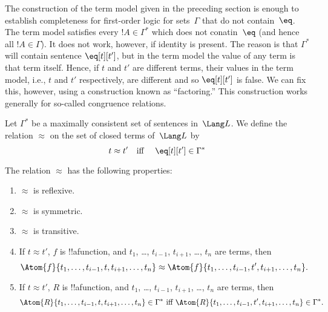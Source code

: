 \documentclass[../../include/open-logic-section]{subfiles}
\begin{document}

\begin{explain}
The construction of the term model given in the preceding section is
enough to establish completeness for first-order logic for
sets~$\Gamma$ that do not contain~$\eq$.  The term model satisfies
every $!A \in \Gamma^*$ which does not conatin~$\eq$ (and hence all
$!A \in \Gamma$).  It does not work, however, if identity is present.
The reason is that $\Gamma^*$ will contain sentence $\eq[t][t']$, but
in the term model the value of any term is that term itself. Hence, if
$t$ and $t'$ are different terms, their values in the term model,
i.e., $t$ and $t'$ respectively, are different and so $\eq[t][t']$ is
false.  We can fix this, however, using a construction known as
``factoring.''  This construction works generally for so-called
congruence relations.
\end{explain}

\begin{defn}
Let $\Gamma^*$ be a maximally consistent set of sentences in~$\Lang
L$. We define the relation $\approx$ on the set of closed terms
of~$\Lang L$ by
\[
t \approx t' \text{\quad iff \quad} \eq[t][t'] \in \Gamma^*
\]
\end{defn}

\begin{prop}
The relation $\approx$ has the following properties:
\begin{enumerate}
\item $\approx$ is reflexive.
\item $\approx$ is symmetric.
\item  $\approx$ is transitive.
\item If $t \approx t'$, $f$ is !!a{function}, and $t_1$, \dots,
  $t_{i-1}$, $t_{i+1}$, \dots, $t_n$ are terms, then 
\[
\Atom{f}{t_1,\dots, t_{i-1}, t, t_{i+1}, \dots, t_n} \approx 
\Atom{f}{t_1,\dots, t_{i-1}, t', t_{i+1}, \dots, t_n}.
\]
\item If $t \approx t'$, $R$ is !!a{function}, and $t_1$, \dots,
  $t_{i-1}$, $t_{i+1}$, \dots, $t_n$ are terms, then 
\[
\Atom{R}{t_1,\dots, t_{i-1}, t, t_{i+1}, \dots, t_n} \in \Gamma^* \text{ iff } 
\Atom{R}{t_1,\dots, t_{i-1}, t', t_{i+1}, \dots, t_n} \in \Gamma^*.
\]
\end{enumerate}
\end{prop}
\end{document}
